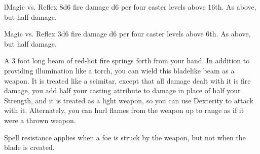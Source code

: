 \begin{spellheader}
\end{spellheader}
\begin{spelleffects}
    \begin{spellattack}l{Magic vs. Reflex}
        \spellsuccess 8d6 fire damage \add d6 per four caster levels above 16th.
        \spellfailure As above, but half damage.
    \end{spellattack}
\end{spelleffects}
\begin{spellfooter}

\end{spellfooter}

\begin{spellheader}
\end{spellheader}
\begin{spelleffects}
    \begin{spellattack}{Magic vs. Reflex}
        \spellsuccess 3d6 fire damage \add d6 per four caster levels above 6th.
        \spellfailure As above, but half damage.
    \end{spellattack}
\end{spelleffects}
\begin{spellfooter}
    \spellnotes \destructivespellnotes

    \firespellnotes
\end{spellfooter}

\begin{spellheader}
\end{spellheader}
\begin{spelleffects}
    \spelldur{\durlong \dismissable}
    \spelleffect A 3 foot long beam of red-hot fire springs forth from your hand. In addition to providing illumination like a torch, you can wield this bladelike beam as a weapon. It is treated like a scimitar, except that all damage dealt with it is fire damage, you add half your casting attribute to damage in place of half your Strength, and it is treated as a light weapon, so you can use Dexterity to attack with it. Alternately, you can hurl flames from the weapon up to \rngmed range as if it were a thrown weapon.
    \spellnotes \firespellnotes

    Spell resistance applies when a foe is struck by the weapon, but not when the blade is created.
\end{spelleffects}
\begin{spellfooter}

\end{spellfooter}

